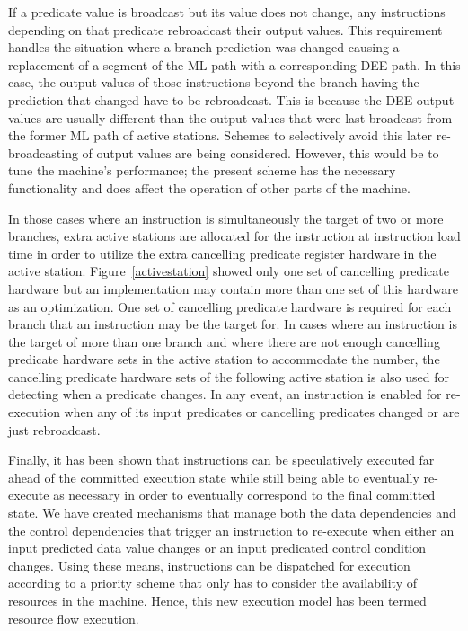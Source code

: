 \documentclass[10pt,dvips]{article}
\begin{document}
If a predicate value is broadcast but its value does not change, any
instructions depending on that predicate rebroadcast their output
values.  This requirement handles the situation where a branch
prediction was changed causing a replacement of a segment of the ML
path with a corresponding DEE path.  In this case, the output values of
those instructions beyond the branch having the prediction that changed
have to be rebroadcast. This is because the DEE output values
are usually different than the output
values that were last broadcast from the former ML path of active
stations.  Schemes to selectively avoid this later re-broadcasting of
output values are being considered. However, this would be to tune
the machine's performance; the present scheme has the necessary
functionality and does affect the operation of other parts of the
machine.

In those cases where an instruction is simultaneously the target of two
or more branches, extra active stations are allocated for the
instruction at instruction load time in order to utilize the extra
cancelling predicate register hardware in the active station.
Figure~\ref{activestation} showed only one set of cancelling predicate
hardware but an implementation may contain more than one set of this
hardware as an optimization.  One set of cancelling predicate hardware
is required for each branch that an instruction may be the target for.
In cases where an instruction is the target of more than one branch and
where there are not enough cancelling predicate hardware sets in the
active station to accommodate the number, the cancelling predicate
hardware sets of the following active station is also used for
detecting when a predicate changes.  In any event, an instruction is
enabled for re-execution when any of its input predicates or cancelling
predicates changed or are just rebroadcast.

Finally, it has been shown that instructions can be speculatively
executed far ahead of the committed execution state while still
being able to eventually re-execute as necessary in order to
eventually correspond to the final committed state.
We have created mechanisms that manage both the data dependencies and
the control dependencies that trigger an instruction to re-execute
when either an input predicted data value changes or an input
predicated
control condition changes.  Using these means, instructions
can be dispatched for execution according to a priority scheme
that only has to consider the availability of resources
in the machine.  Hence, this new execution model has been termed
resource flow execution.
\end{document}
